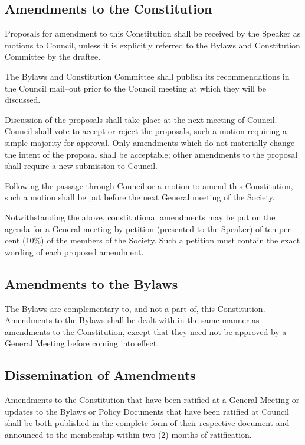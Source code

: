 \subsection {Amendments to the Constitution}
	\begin{longenum}[label*=\arabic*., align=left]
	\item Proposals for amendment to this Constitution shall be received by the Speaker as motions to Council, unless it is explicitly referred to the Bylaws and Constitution Committee by the draftee.
    \item The Bylaws and Constitution Committee shall publish its recommendations in the Council mail--out prior to the Council meeting at which they will be discussed.
    \item Discussion of the proposals shall take place at the next meeting of Council. Council shall vote to accept or reject the proposals, such a motion requiring a simple majority for approval. Only amendments which do not materially change the intent of the proposal shall be acceptable; other amendments to the proposal shall require a new submission to Council.
    \item Following the passage through Council or a motion to amend this Constitution, such a motion shall be put before the next General meeting of the Society. 
    \item Notwithstanding the above, constitutional amendments may be put on the agenda for a General meeting by petition (presented to the Speaker) of ten per cent (10\%) of the members of the Society. Such a petition must contain the exact wording of each proposed amendment.
\end{longenum}
\subsection {Amendments to the Bylaws}
	\begin{longenum}[label*=\arabic*., align=left]
	\item The Bylaws are complementary to, and not a part of, this Constitution. Amendments to the Bylaws shall be dealt with in the same manner as amendments to the Constitution, except that they need not be approved by a General Meeting before coming into effect.
\end{longenum}
\subsection{Dissemination of Amendments}
	\begin{longenum}[label*=\arabic*., align=left]
	\item Amendments to the Constitution that have been ratified at a General Meeting or updates to the Bylaws or Policy Documents that have been ratified at Council shall be both published in the complete form of their respective document and announced to the membership within two (2) months of ratification.
\end{longenum}
\newpage

